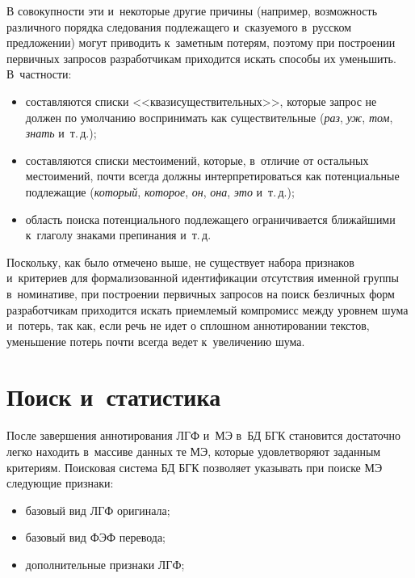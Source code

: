 \begin{multicols}{2}
  В совокупности эти и~некоторые другие причины (например, возможность 
различного порядка следования подлежащего и~сказуемого в~русском 
предложении) могут приводить к~заметным потерям, поэтому при построении 
первичных запросов разработчикам приходится искать способы их уменьшить. 
В~частности: 
  \begin{itemize}
\item составляются списки <<квазисуществительных>>, которые запрос не 
должен по умолчанию воспринимать как существительные (\textit{раз}, 
\textit{уж}, \textit{том}, \textit{знать} и~т.\,д.); 
\item составляются списки местоимений, которые, в~отличие от остальных 
местоимений, почти всегда должны интерпретироваться как потенциальные 
подлежащие (\textit{который}, \textit{которое}, \textit{он}, \textit{она}, 
\textit{это} и~т.\,д.);
\item область поиска потенциального подлежащего ограничивается 
ближайшими к~глаголу знаками препинания и~т.\,д.
\end{itemize}

  Поскольку, как было отмечено выше, не существует набора признаков 
и~критериев для формализованной идентификации отсутствия именной группы 
в~номинативе, при построении первичных запросов на поиск безличных форм 
разработчикам приходится искать приемлемый компромисс между уровнем 
шума и~потерь, так как, если речь не идет о сплошном аннотировании текстов, 
уменьшение потерь почти всегда ведет к~увеличению шума.

\section{Поиск и~статистика}

  После завершения аннотирования ЛГФ и~МЭ в~БД БГК становится 
достаточно легко находить в~массиве данных те МЭ, которые удовлетворяют 
заданным критериям. Поисковая система БД БГК позволяет указывать при 
поиске МЭ следующие признаки:
  \begin{itemize}
\item базовый вид ЛГФ оригинала;
\item базовый вид ФЭФ перевода;
\item дополнительные признаки ЛГФ;
\end{itemize}

\pagebreak

\end{multicols}

